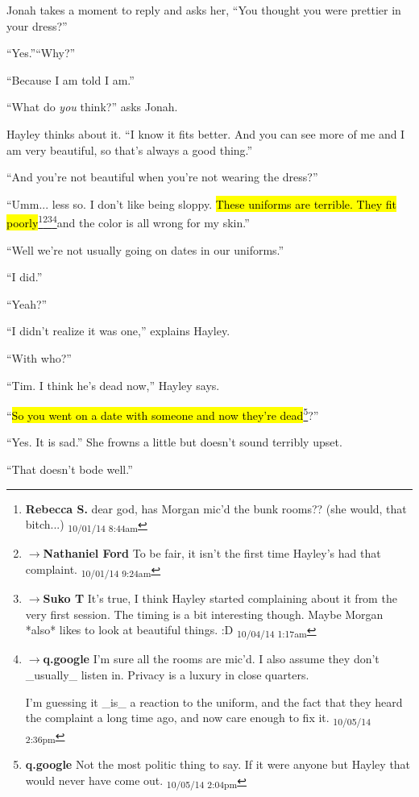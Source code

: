 Jonah takes a moment to reply and asks her, ``You thought you were prettier in your dress?''

``Yes.''``Why?''

``Because I am told I am.''

``What do \textit{you} think?'' asks Jonah.

Hayley thinks about it.  ``I know it fits better.  And you can see more of me and I am very beautiful, so that's always a good thing.''

``And you're not beautiful when you're not wearing the dress?''

``Umm... less so.  I don't like being sloppy.  \hl{These uniforms are terrible.  They fit poorly}\footnote{\textbf{Rebecca S. }dear god, has Morgan mic'd the bunk rooms?? (she would, that bitch...) \textsubscript{10/01/14 8:44am}}\footnote{$\rightarrow$\textbf{Nathaniel Ford }To be fair, it isn't the first time Hayley's had that complaint. \textsubscript{10/01/14 9:24am}}\footnote{$\rightarrow$\textbf{Suko T }It's true, I think Hayley started complaining about it from the very first session. The timing is a bit interesting though.  Maybe Morgan *also* likes to look at beautiful things. :D \textsubscript{10/04/14 1:17am}}\footnote{$\rightarrow$\textbf{q.google }I'm sure all the rooms are mic'd.  I also assume they don't \_usually\_ listen in.  Privacy is a luxury in close quarters.

I'm guessing it \_is\_ a reaction to the uniform, and the fact that they heard the complaint a long time ago, and now care enough to fix it. \textsubscript{10/05/14 2:36pm}}and the color is all wrong for my skin.''

``Well we're not usually going on dates in our uniforms.''

``I did.''

``Yeah?''

``I didn't realize it was one,'' explains Hayley.

``With who?''

``Tim.  I think he's dead now,'' Hayley says.  

``\hl{So you went on a date with someone and now they're dead}\footnote{\textbf{q.google }Not the most politic thing to say.  If it were anyone but Hayley that would never have come out. \textsubscript{10/05/14 2:04pm}}?''

``Yes. It is sad.''  She frowns a little but doesn't sound terribly upset.

``That doesn't bode well.''

